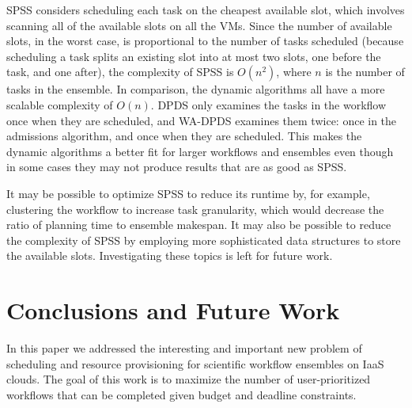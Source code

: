 \documentclass[conference]{IEEEtran}
\begin{document}

SPSS
considers scheduling each task on the cheapest available slot, which involves
scanning all of the available slots on all the VMs. Since the number of
available slots, in the worst case, is proportional to the number of tasks
scheduled
 (because scheduling a task splits an existing slot into at most two
slots, one before the task, and one after), the complexity of SPSS is $O(n^2)$, where $n$ is the number of
tasks in the ensemble. In comparison, the dynamic
algorithms all have a more scalable complexity of $O(n)$. DPDS only examines
the tasks in the workflow once when they are scheduled, and WA-DPDS examines
them twice: once in the admissions algorithm, and once when they are
scheduled. This makes the dynamic algorithms a better fit for larger workflows
and ensembles even though in some cases they may not produce results that are as good as
SPSS.

It may be possible to optimize SPSS to reduce its runtime by, for example,
clustering the workflow to increase task granularity, which would decrease the
ratio of planning time to ensemble makespan. It may also be possible to reduce
the complexity of SPSS by employing more sophisticated data structures to
store the available slots. Investigating these topics is left for future work.


\section{Conclusions and Future Work}
\label{sec:conclusions}

In this paper we addressed the interesting and important new problem of
scheduling and resource provisioning for scientific workflow ensembles on IaaS
clouds. The goal of this work is to maximize the number of user-prioritized
workflows that can be completed given budget and deadline constraints.

\end{document}
